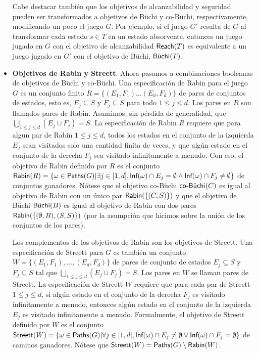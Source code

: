 \begin{itemize}
	      Cabe destacar también que los objetivos de alcanzabilidad y seguridad pueden
	      ser transformados a objetivos de Büchi y co-Büchi, respectivamente, modificando
	      un poco el juego $G$. Por ejemplo, si el juego $G'$ resulta de $G$ al
	      transformar cada estado $s \in T$ en un estado absorvente, entonces un juego
	      jugado en $G$ con el objetivo de alcanzabilidad $\Reach(T)$ es equivalente a un
	      juego jugado en $G'$ con el objetivo de Büchi, $\Buchi(T)$.

	\item \textbf{Objetivos de Rabin y Streett}. Ahora pasamos a combinaciones booleanas de objetivos de Büchi y co-Büchi. Una especificación de Rabin para el juego $G$ es un conjunto finito $R = \{(E_1,F_1) \dots (E_d, F_d)\}$ de pares de conjuntos de estados, esto es, $E_j \subseteq S$ y $F_j \subseteq S$ para todo $ 1 \leq j \leq d$. Los pares en $R$ son llamados pares de Rabin. Asumimos, sin pérdida de generalidad, que $\bigcup_{1 \leq j \leq d} (E_j \cup F_j) = S$. La especificación de Rabin $R$ requiere que para algun par de Rabin $1 \leq j \leq d$, todos los estados en el conjunto de la izquierda $E_j$ sean visitados solo una cantidad finita de veces, y que algún estado en el conjunto de la derecha $F_j$ sea visitado infinitamente a menudo. Con eso, el objetivo de Rabin definido por $R$ es el conjunto $\Rabin(R) = \{\omega \in \Paths(G) | \exists j \in [1, d], \Inf(\omega) \cap E_j = \emptyset \wedge \Inf(\omega) \cap F_j \neq \emptyset \}$ de conjuntos ganadores. Nótese que el objetivo co-Büchi $\coBuchi(C)$ es igual al objetivo de Rabin con un único par $\Rabin(\{(C,S)\})$ y que el objetivo de Büchi $\Buchi(B)$ es igual al objetivo de Rabin con dos pares $\Rabin(\{(\emptyset, B), (S,S)\})$ (por la asumpción que hicimos sobre la unión de los conjuntos de los pares).

	      Los complementos de los objetivos de Rabin son los objetivos de Streett. Una
	      especificación de Streett para $G$ es también un conjunto $W = \{(E_1, F_1),
		      \dots, (E_d, F_d)\}$ de pares de conjunto de estados $E_j \subseteq S$ y $F_j
		      \subseteq S$ tal que $\bigcup_{1 \leq j \leq d} (E_j \cup F_j) = S$. Los pares
	      en $W$ se llaman pares de Streett. La especificación de Streett $W$ requiere
	      que para cada par de Streett $1 \leq j \leq d$, si algún estado en el conjunto
	      de la derecha $F_j$ es visitado infinitamente a menudo, entonces algún estado
	      en el conjunto de la izquierda $E_j$ es visitado infinitamente a menudo.
	      Formalmente, el objetivo de Streett definido por $W$ es el conjunto
	      $\Streett(W) = \{\omega \in \Paths(G) | \forall j \in [1,d], \Inf(\omega) \cap
		      E_j \neq \emptyset \vee \Inf(\omega) \cap F_j = \emptyset\}$ de caminos
	      ganadores. Nótese que $\Streett(W) = \Paths(G) \setminus \Rabin(W)$.


\end{itemize}
